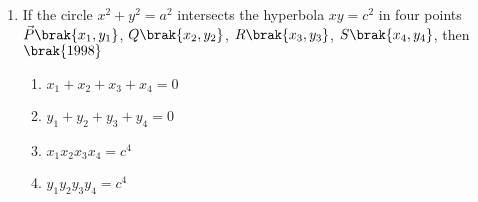 \begin{enumerate}
\item If the circle $x^2+y^2=a^2$ intersects the hyperbola $xy=c^2$ in four points $\vec{P}\brak{x_1, y_1}$, $Q\brak{x_2, y_2}$, $R\brak{x_3, y_3}$, $S\brak{x_4, y_4}$, then
%
    \hfill$\brak{1998}$
\begin{multicols}{2}
\begin{enumerate}
    \item $x_1+x_2+x_3+x_4=0$
    \item $y_1+y_2+y_3+y_4=0$
    \item $x_1x_2x_3x_4=c^4$
    \item $y_1y_2y_3y_4=c^4$
%
\end{enumerate}
\end{multicols}
\end{enumerate}
